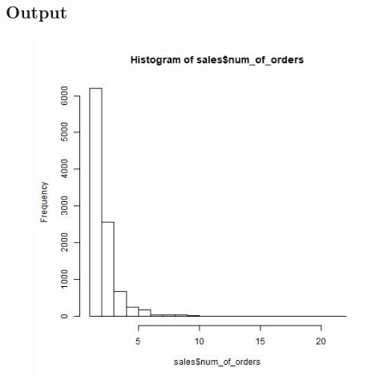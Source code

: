 \documentclass{article}
\begin{document}
\subsection{Output}

\begin{figure}[H]
    \centering
    \newline
\end{figure}

\begin{figure}[H]
    \centering
    \includegraphics[width=1\textwidth]{sales_hist.jpeg}
\end{figure}
\end{document}
